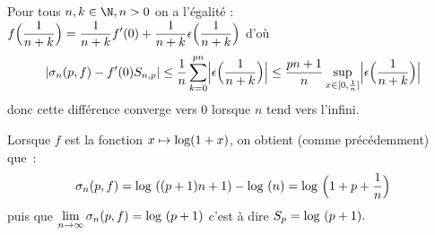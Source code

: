 {\begin{enumerate}
{Pour tous $  n, k \in {\N}  ,   n>0  $ on a l'\' egalit\' e : $
\displaystyle{ f\Bigl( \frac{1}{ n+k} \Bigr) =\frac{1}{
n+k}f'(0)+\frac{1}{ n+k}\epsilon \Bigl( \frac{1}{ n+k} \Bigr)}
  $
d'o\`u $$  \vert \sigma _{n}(p,f)-f'(0)S_{n,p}\vert \leq
\displaystyle { \frac{1}{ n} \sum _{\scriptstyle
k=0}^{\scriptstyle  pn}\Bigl\vert \epsilon \Bigl( \frac{1}{
n+k} \Bigr) \Bigr\vert \leq  \displaystyle { \frac{pn+1}{ n}}\sup
_{\scriptstyle x\in [ 0, \frac{1}{ n}] } \Bigl \vert \epsilon
\Bigl( \frac{1}{ n+k}  \Bigr)\Bigr \vert }$$ donc cette
diff\'erence converge vers $  0   $ lorsque $  n   $ tend vers
l'infini.


Lorsque $  f  $ est la fonction $  x\mapsto \hbox{log} (1+x)  $,
on obtient (comme pr\'ec\'edemment) que~:  $$ \displaystyle{
\sigma _n(p,f)= \hbox{log }( (p+1)n+1)-\hbox{log }(n)=\hbox{log
}\Bigl( {1+p +\frac{1}{ n}} \Bigr)}  $$ puis que $  \displaystyle{
\lim _{n\rightarrow \infty }\sigma _n(p,f)=\hbox{log }(p+1)}  $
c'est \`a dire $  S_p=\hbox{log }(p+1)  .$}
\end{enumerate}
}
